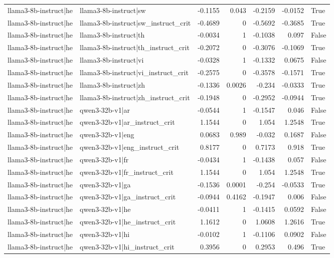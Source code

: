 \begin{table}
\begin{tabular}{l l r r r r l}
llama3-8b-instruct|he & llama3-8b-instruct|sw & -0.1155 & 0.043 & -0.2159 & -0.0152 & True \\
llama3-8b-instruct|he & llama3-8b-instruct|sw_instruct_crit & -0.4689 & 0 & -0.5692 & -0.3685 & True \\
llama3-8b-instruct|he & llama3-8b-instruct|th & -0.0034 & 1 & -0.1038 & 0.097 & False \\
llama3-8b-instruct|he & llama3-8b-instruct|th_instruct_crit & -0.2072 & 0 & -0.3076 & -0.1069 & True \\
llama3-8b-instruct|he & llama3-8b-instruct|vi & -0.0328 & 1 & -0.1332 & 0.0675 & False \\
llama3-8b-instruct|he & llama3-8b-instruct|vi_instruct_crit & -0.2575 & 0 & -0.3578 & -0.1571 & True \\
llama3-8b-instruct|he & llama3-8b-instruct|zh & -0.1336 & 0.0026 & -0.234 & -0.0333 & True \\
llama3-8b-instruct|he & llama3-8b-instruct|zh_instruct_crit & -0.1948 & 0 & -0.2952 & -0.0944 & True \\
llama3-8b-instruct|he & qwen3-32b-v1|ar & -0.0544 & 1 & -0.1547 & 0.046 & False \\
llama3-8b-instruct|he & qwen3-32b-v1|ar_instruct_crit & 1.1544 & 0 & 1.054 & 1.2548 & True \\
llama3-8b-instruct|he & qwen3-32b-v1|eng & 0.0683 & 0.989 & -0.032 & 0.1687 & False \\
llama3-8b-instruct|he & qwen3-32b-v1|eng_instruct_crit & 0.8177 & 0 & 0.7173 & 0.918 & True \\
llama3-8b-instruct|he & qwen3-32b-v1|fr & -0.0434 & 1 & -0.1438 & 0.057 & False \\
llama3-8b-instruct|he & qwen3-32b-v1|fr_instruct_crit & 1.1544 & 0 & 1.054 & 1.2548 & True \\
llama3-8b-instruct|he & qwen3-32b-v1|ga & -0.1536 & 0.0001 & -0.254 & -0.0533 & True \\
llama3-8b-instruct|he & qwen3-32b-v1|ga_instruct_crit & -0.0944 & 0.4162 & -0.1947 & 0.006 & False \\
llama3-8b-instruct|he & qwen3-32b-v1|he & -0.0411 & 1 & -0.1415 & 0.0592 & False \\
llama3-8b-instruct|he & qwen3-32b-v1|he_instruct_crit & 1.1612 & 0 & 1.0608 & 1.2616 & True \\
llama3-8b-instruct|he & qwen3-32b-v1|hi & -0.0102 & 1 & -0.1106 & 0.0902 & False \\
llama3-8b-instruct|he & qwen3-32b-v1|hi_instruct_crit & 0.3956 & 0 & 0.2953 & 0.496 & True \\

\end{tabular}
\end{table}
